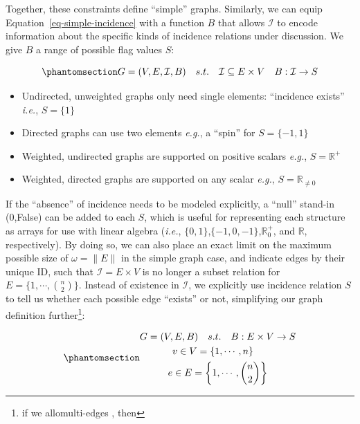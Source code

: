 \documentclass[%
	12pt,
		oneside,
		letterpaper
]{book}
\providecommand{\tightlist}{%
  \setlength{\itemsep}{0pt}\setlength{\parskip}{0pt}}\usepackage{longtable,booktabs,array}
\begin{document}
Together, these constraints define ``simple'' graphs. Similarly, we can
equip Equation~\ref{eq-simple-incidence} with a function \(B\) that
allows \(\mathcal{I}\) to encode information about the specific kinds of
incidence relations under discussion. We give \(B\) a range of possible
flag values \(S\):

\begin{equation}\phantomsection\label{eq-map-incidence}{
G = (V,E,\mathcal{I},B) \quad s.t. \quad \mathcal{I} \subseteq E\times V\quad B:\mathcal{I}\rightarrow S
}\end{equation}

\begin{itemize}
\tightlist
\item
  Undirected, unweighted graphs only need single elements: ``incidence
  exists'' \emph{i.e.}, \(S=\{1\}\)
\item
  Directed graphs can use two elements \emph{e.g.}, a ``spin'' for
  \(S=\{-1,1\}\)
\item
  Weighted, undirected graphs are supported on positive scalars
  \emph{e.g.}, \(S=\mathbb{R}^+\)
\item
  Weighted, directed graphs are supported on any scalar \emph{e.g.},
  \(S=\mathbb{R}_{\neq0}\)
\end{itemize}

If the ``absence'' of incidence needs to be modeled explicitly, a
``null'' stand-in (0,False) can be added to each \(S\), which is useful
for representing each structure as arrays for use with linear algebra
(\emph{i.e.}, \(\{0,1\}\),\(\{-1,0,-1\}\),\(\mathbb{R}^+_0\), and
\(\mathbb{R}\), respectively). By doing so, we can also place an exact
limit on the maximum possible size of \(\omega=\|E\|\) in the simple
graph case, and indicate edges by their unique ID, such that
\(\mathcal{I}= E\times V\) is no longer a subset relation for
\(E=\{1,\cdots,{n\choose2} \}\). Instead of existence in
\(\mathcal{I}\), we explicitly use incidence relation \(S\) to tell us
whether each possible edge ``exists'' or not, simplifying our graph
definition further\footnote{ if we allomulti-edges , then}:

\begin{equation}\phantomsection\label{eq-incidence-graph}{
\begin{gathered}
G  = (V,E,B) \quad s.t. \quad B : E\times V \rightarrow S\\
v \in V = \{1,\cdots, n\}\quad \\
e \in E = \left\{1,\cdots, {n\choose 2} \right\}
\end{gathered}
}\end{equation}
\end{document}
